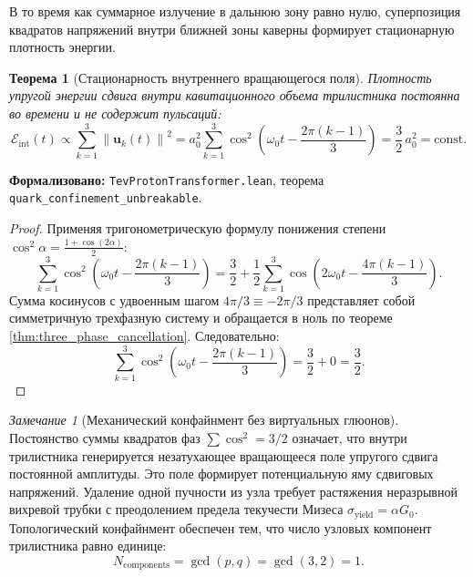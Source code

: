 \documentclass[11pt,a4paper]{article}
\newtheorem{theorem}{Теорема}
\theoremstyle{definition}
\theoremstyle{remark}
\newtheorem{remark}{Замечание}
\begin{document}
В то время как суммарное излучение в дальнюю зону равно нулю, суперпозиция квадратов напряжений внутри ближней зоны каверны формирует стационарную плотность энергии.

\begin{theorem}[Стационарность внутреннего вращающегося поля]
\label{thm:rotating_confinement_field}
Плотность упругой энергии сдвига внутри кавитационного объема трилистника постоянна во времени и не содержит пульсаций:
\begin{equation}
	\mathcal{E}_{\mathrm{int}}(t) \propto \sum_{k=1}^3 \left\|\mathbf{u}_k(t)\right\|^2 = a_0^2 \sum_{k=1}^3 \cos^2\left(\omega_0 t - \frac{2\pi(k-1)}{3}\right) = \frac{3}{2} \, a_0^2 = \text{const}.
	\label{eq:three_phase_energy_exact}
\end{equation}
\end{theorem}

\noindent\small\textbf{Формализовано:} \texttt{TevProtonTransformer.lean}, теорема \texttt{quark_confinement_unbreakable}.



\begin{proof}
Применяя тригонометрическую формулу понижения степени $\cos^2\alpha = \frac{1 + \cos(2\alpha)}{2}$:
\begin{equation}
	\sum_{k=1}^3 \cos^2\left(\omega_0 t - \frac{2\pi(k-1)}{3}\right) = \frac{3}{2} + \frac{1}{2} \sum_{k=1}^3 \cos\left(2\omega_0 t - \frac{4\pi(k-1)}{3}\right).
\end{equation}
Сумма косинусов с удвоенным шагом $4\pi/3 \equiv -2\pi/3$ представляет собой симметричную трехфазную систему и обращается в ноль по теореме \ref{thm:three_phase_cancellation}. Следовательно:
\begin{equation}
	\sum_{k=1}^3 \cos^2\left(\omega_0 t - \frac{2\pi(k-1)}{3}\right) = \frac{3}{2} + 0 = \frac{3}{2}.
\end{equation}
\end{proof}

\begin{remark}[Механический конфайнмент без виртуальных глюонов]
Постоянство суммы квадратов фаз $\sum \cos^2 = 3/2$ означает, что внутри трилистника генерируется незатухающее вращающееся поле упругого сдвига постоянной амплитуды. Это поле формирует потенциальную яму сдвиговых напряжений. Удаление одной пучности из узла требует растяжения неразрывной вихревой трубки с преодолением предела текучести Мизеса $\sigma_{\mathrm{yield}} = \alpha G_0$. Топологический конфайнмент обеспечен тем, что число узловых компонент трилистника равно единице:
\begin{equation}
	N_{\mathrm{components}} = \gcd(p, q) = \gcd(3, 2) = 1.
	\label{eq:gcd_confinement_condition}
\end{equation}
\end{remark}
\end{document}
